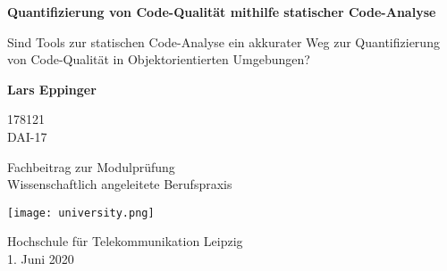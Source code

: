 \begin{titlepage}
    \begin{center}
        \vspace*{1cm}
        
        \Huge
        \textbf{Quantifizierung von Code-Qualität mithilfe statischer Code-Analyse}
        
        \vspace{0.5cm}
        \LARGE
        Sind Tools zur statischen Code-Analyse ein akkurater Weg zur Quantifizierung von Code-Qualität in Objektorientierten Umgebungen?
        
        \vspace{1.5cm}
        
        \textbf{Lars Eppinger}

        \Large
        178121\\
        DAI-17
        
        \vfill
        
        Fachbeitrag zur Modulprüfung\\Wissenschaftlich angeleitete Berufspraxis
        
        \vspace{0.8cm}
        
        \texttt{[image: university.png]}
        
        \Large
        Hochschule für Telekommunikation Leipzig\\
        1. Juni 2020
        
    \end{center}
\end{titlepage}
